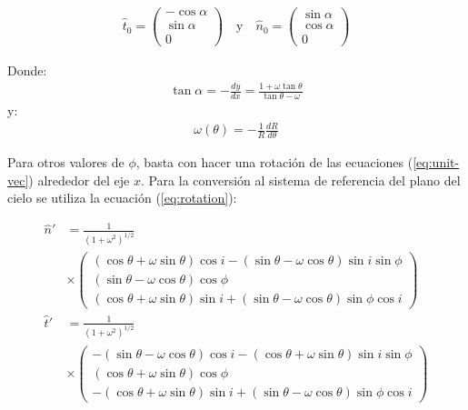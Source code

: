 \begin{align}
  \hat{t}_0 =
  \left(
  \begin{array}{c}
    -\cos\alpha \\
    \sin\alpha \\
    0
  \end{array}
  \right)
  \quad \mathrm{y} \quad
  \hat{n}_0 =
  \left(
  \begin{array}{c}
    \sin\alpha \\
    \cos\alpha \\
    0
  \end{array}
  \right)
  \label{eq:unit-vec}
\end{align}

Donde:
\begin{align}
  \tan\alpha = -\frac{dy}{dx} = \frac{1+\omega\tan\theta}{\tan\theta-\omega}
\end{align}
y:
\begin{align}
  \omega(\theta) = -\frac{1}{R}\frac{dR}{d\theta} 
\end{align}

Para otros valores de $\phi$, basta con hacer una rotación de las ecuaciones
(\ref{eq:unit-vec}) alrededor del eje $x$. Para la conversión al sistema de
referencia del plano del cielo se utiliza la ecuación (\ref{eq:rotation}):

\begin{align}
  \hat{n}' &= \frac{1}{\left(1 + \omega^2\right)^{1/2}} \\
           & \times \left(
             \begin{array}{c}
               (\cos\theta+\omega\sin\theta)\cos i-(\sin\theta-\omega\cos\theta)\sin i\sin\phi\\
               (\sin\theta-\omega\cos\theta)\cos\phi \\
               (\cos\theta+\omega\sin\theta)\sin i+(\sin\theta-\omega\cos\theta)\sin\phi\cos i
             \end{array}
                    \right) \\
    \hat{t}' &= \frac{1}{\left(1 + \omega^2\right)^{1/2}} \\
           & \times \left(
             \begin{array}{c}
               -(\sin\theta-\omega\cos\theta)\cos i-(\cos\theta+\omega\sin\theta)\sin i\sin\phi\\
               (\cos\theta+\omega\sin\theta)\cos\phi \\
               -(\cos\theta+\omega\sin\theta)\sin i+(\sin\theta-\omega\cos\theta)\sin\phi\cos i
             \end{array}
             \right) 
\end{align}


